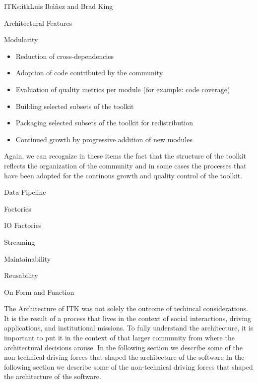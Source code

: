 \begin{aosachapter}{ITK}{s:itk}{Luis Ib\'{a}\~{n}ez and Brad King}
\begin{aosasect1}{Architectural Features}
\begin{aosasect2}{Modularity}
\begin{itemize}
\item Reduction of cross-dependencies
\item Adoption of code contributed by the community
\item Evaluation of quality metrics per module (for example: code coverage)
\item Building selected subsets of the toolkit
\item Packaging selected subsets of the toolkit for redistribution
\item Continued growth by progressive addition of new modules
\end{itemize}
\end{aosasect2}

Again, we can recognize in these items the fact that the structure of the
toolkit reflects the organization of the community and in some cases the
processes that have been adopted for the continous growth and quality control
of the toolkit.

\begin{aosasect2}{Data Pipeline}
\end{aosasect2}

\begin{aosasect2}{Factories}
\end{aosasect2}

\begin{aosasect2}{IO Factories}


\end{aosasect2}

\begin{aosasect2}{Streaming}
\end{aosasect2}

\begin{aosasect2}{Maintainability}
\end{aosasect2}

\begin{aosasect2}{Reusability}
\end{aosasect2}

\end{aosasect1}

\begin{aosasect1}{On Form and Function}

The Architecture of ITK was not solely the outcome of techincal
considerations. It is the result of a process that lives in the
context of social interactions, driving applications, and
institutional missions. To fully understand the architecture, it is
important to put it in the context of that larger community from where
the architectural decisions arouse. In the following section we
describe some of the non-technical driving forces that shaped the
architecture of the software In the following section we describe some
of the non-technical driving forces that shaped the architecture of
the software.


\end{aosasect1}
\end{aosachapter}
